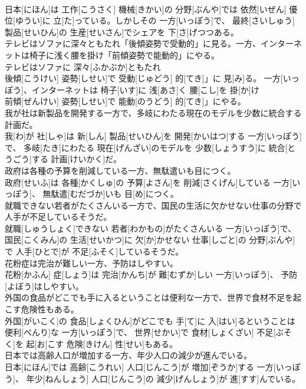 \documentclass[8pt]{extreport}
\begin{document}
\begin{CJK}{UTF8}{min}
\\	日本[にほん]は 工作[こうさく] 機械[きかい]の 分野[ぶんや]では 依然[いぜん] 優位[ゆうい]に 立[た]っている。しかしその 一方[いっぽう]で、 最終[さいしゅう] 製品[せいひん]の 生産[せいさん]でシェアを 下[さ]げつつある。
\\	テレビはソファに深々ともたれ「後傾姿勢で受動的」に見る。一方、インターネットは椅子に浅く腰を掛け「前傾姿勢で能動的」にやる。	
\\	テレビはソファに 深々[ふかぶか]ともたれ
\\	後傾[こうけい] 姿勢[しせい]で 受動[じゅどう] 的[てき]」に 見[み]る。 一方[いっぽう]、インターネットは 椅子[いす]に 浅[あさ]く 腰[こし]を 掛[か]け
\\	前傾[ぜんけい] 姿勢[しせい]で 能動[のうどう] 的[てき]」にやる。
\\	我が社は新製品を開発する一方で、多岐にわたる現在のモデルを少数に統合する計画だ。	
\\	我[わ]が 社[しゃ]は 新[しん] 製品[せいひん]を 開発[かいはつ]する 一方[いっぽう]で、 多岐[たき]にわたる 現在[げんざい]のモデルを 少数[しょうすう]に 統合[とうごう]する 計画[けいかく]だ。
\\	政府は各種の予算を削減している一方、無駄遣いも目につく。	
\\	政府[せいふ]は 各種[かくしゅ]の 予算[よさん]を 削減[さくげん]している 一方[いっぽう]、 無駄遣[むだづか]いも 目[め]につく。
\\	就職できない若者がたくさんいる一方で、国民の生活に欠かせない仕事の分野で人手が不足しているそうだ。	
\\	就職[しゅうしょく]できない 若者[わかもの]がたくさんいる 一方[いっぽう]で、 国民[こくみん]の 生活[せいかつ]に 欠[か]かせない 仕事[しごと]の 分野[ぶんや]で 人手[ひとで]が 不足[ふそく]しているそうだ。
\\	花粉症は完治が難しい一方、予防はしやすい。	
\\	花粉[かふん] 症[しょう]は 完治[かんち]が 難[むずか]しい 一方[いっぽう]、 予防[よぼう]はしやすい。
\\	外国の食品がどこでも手に入るということは便利な一方で、世界で食材不足を起こす危険性もある。	
\\	外国[がいこく]の 食品[しょくひん]がどこでも 手[て]に 入[はい]るということは 便利[べんり]な 一方[いっぽう]で、 世界[せかい]で 食材[しょくざい] 不足[ぶそく]を 起[お]こす 危険[きけん] 性[せい]もある。
\\	日本では高齢人口が増加する一方、年少人口の減少が進んでいる。	
\\	日本[にほん]では 高齢[こうれい] 人口[じんこう]が 増加[ぞうか]する 一方[いっぽう]、 年少[ねんしょう] 人口[じんこう]の 減少[げんしょう]が 進[すす]んでいる。

\end{CJK}
\end{document}
